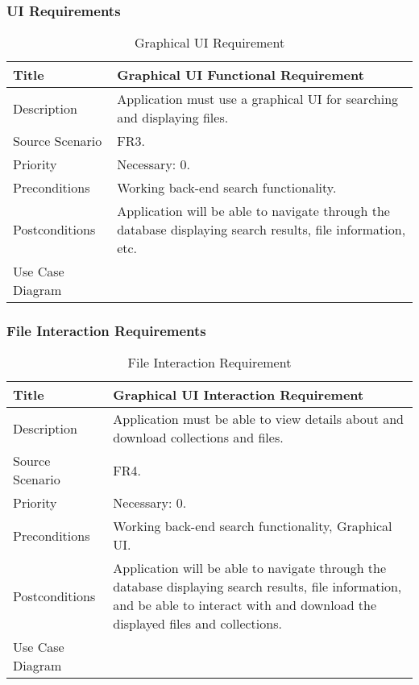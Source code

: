 \subsubsection{UI Requirements}
  \begin{table}[h!]
    \caption{Graphical UI Requirement}
    \label{system-requirements/functional-requirements/ui}
    \begin{tabularx}{\textwidth}{|l|X|}
      \hline
      Title            & Graphical UI Functional Requirement \\ \hline
      Description      & Application must use a graphical UI for searching and
                         displaying files. \\ \hline
      Source Scenario  & FR3. \\ \hline
      Priority         & Necessary: 0. \\ \hline
      Preconditions    & Working back-end search functionality. \\ \hline
      Postconditions   & Application will be able to navigate through the database
                         displaying search results, file information, etc. \\ \hline
      Use Case Diagram & \\ \hline
    \end{tabularx}
  \end{table}

\newpage

\subsubsection{File Interaction Requirements}
  \begin{table}[h!]
    \caption{File Interaction Requirement}
    \label{system-requirements/functional-requirements/file-interaction}
    \begin{tabularx}{\textwidth}{|l|X|}
      \hline
      Title            & Graphical UI Interaction Requirement \\ \hline
      Description      & Application must be able to view details about and
                         download collections and files. \\ \hline
      Source Scenario  & FR4. \\ \hline
      Priority         & Necessary: 0. \\ \hline
      Preconditions    & Working back-end search functionality, Graphical UI.
                         \\ \hline
      Postconditions   & Application will be able to navigate through the
                         database displaying search results, file information,
                         and be able to interact with and download the displayed
                         files and collections. \\ \hline
      Use Case Diagram & \\ \hline
    \end{tabularx}
  \end{table}

